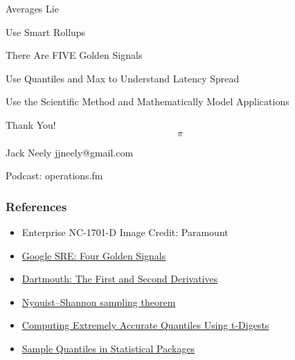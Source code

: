 
\begin{frame}[standout]
    \small

    Averages Lie

    Use Smart Rollups

    There Are FIVE Golden Signals

    Use Quantiles and Max to Understand Latency Spread

    Use the Scientific Method and Mathematically Model Applications
\end{frame}

\begin{frame}[standout]
    Thank You!
    $$\pi$$

    \small
    Jack Neely
    jjneely@gmail.com

    Podcast: operations.fm
\end{frame}

\appendix

\begin{frame}
    \frametitle{References}

    \begin{itemize}
        \item Enterprise NC-1701-D Image Credit: Paramount
        \item \href{https://sre.google/sre-book/monitoring-distributed-systems/}{\alert{Google SRE: Four Golden Signals}}
        \item \href{https://math.dartmouth.edu/opencalc2/cole/lecture8.pdf}{\alert{Dartmouth: The First and Second Derivatives}}
        \item \href{https://en.wikipedia.org/wiki/Nyquist\%E2\%80\%93Shannon_sampling_theorem}{\alert{Nyquist–Shannon sampling theorem}}
        \item \href{https://github.com/tdunning/t-digest/blob/main/docs/t-digest-paper/histo.pdf}{\alert{Computing Extremely Accurate Quantiles Using t-Digests}}
        \item \href{https://www.researchgate.net/publication/222105754_Sample_Quantiles_in_Statistical_Packages}{\alert{Sample Quantiles in Statistical Packages}}
    \end{itemize}
\end{frame}

